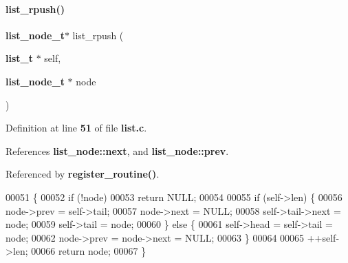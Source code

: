 \paragraph{list\+\_\+rpush()}
{\footnotesize\ttfamily \textbf{ list\+\_\+node\+\_\+t}$\ast$ list\+\_\+rpush (\begin{DoxyParamCaption}\item[{\textbf{ list\+\_\+t} $\ast$}]{self,  }\item[{\textbf{ list\+\_\+node\+\_\+t} $\ast$}]{node }\end{DoxyParamCaption})}



Definition at line \textbf{ 51} of file \textbf{ list.\+c}.



References \textbf{ list\+\_\+node\+::next}, and \textbf{ list\+\_\+node\+::prev}.



Referenced by \textbf{ register\+\_\+routine()}.


\begin{DoxyCode}
00051                                                          \{
00052   \textcolor{keywordflow}{if} (!node)
00053     \textcolor{keywordflow}{return} NULL;
00054 
00055   \textcolor{keywordflow}{if} (self->len) \{
00056     node->prev = \textcolor{keyword}{self}->tail;
00057     node->next = NULL;
00058     \textcolor{keyword}{self}->tail->next = node;
00059     \textcolor{keyword}{self}->tail = node;
00060   \} \textcolor{keywordflow}{else} \{
00061     \textcolor{keyword}{self}->head = \textcolor{keyword}{self}->tail = node;
00062     node->prev = node->next = NULL;
00063   \}
00064 
00065   ++\textcolor{keyword}{self}->len;
00066   \textcolor{keywordflow}{return} node;
00067 \}
\end{DoxyCode}
